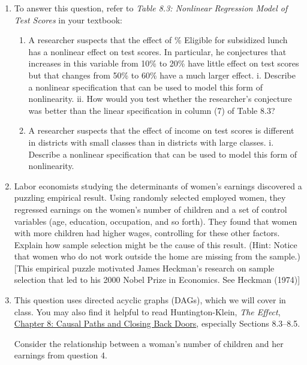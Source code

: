 \documentclass[11pt]{article}
\begin{document}
\begin{enumerate}
\item
  To answer this question, refer to \emph{Table 8.3: Nonlinear
  Regression Model of Test Scores} in your textbook:


\begin{enumerate}
\def\labelenumi{\alph{enumi}.}

\item
  A researcher suspects that the effect of \% Eligible for subsidized
  lunch has a nonlinear effect on test scores. In particular, he
  conjectures that increases in this variable from 10\% to 20\% have
  little effect on test scores but that changes from 50\% to 60\% have a
  much larger effect. i. Describe a nonlinear specification that can be
  used to model this form of nonlinearity. ii. How would you test
  whether the researcher's conjecture was better than the linear
  specification in column (7) of Table 8.3?
\item
  A researcher suspects that the effect of income on test scores is
  different in districts with small classes than in districts with large
  classes. i. Describe a nonlinear specification that can be used to
  model this form of nonlinearity.
\end{enumerate}



\item
  Labor economists studying the determinants of women's earnings
  discovered a puzzling empirical result. Using randomly selected
  employed women, they regressed earnings on the women's number of
  children and a set of control variables (age, education, occupation,
  and so forth). They found that women with more children had higher
  wages, controlling for these other factors. Explain how sample
  selection might be the cause of this result. (Hint: Notice that women
  who do not work outside the home are missing from the sample.) {[}This
  empirical puzzle motivated James Heckman's research on sample
  selection that led to his 2000 Nobel Prize in Economics. See Heckman
  (1974){]}


\item
  This question uses directed acyclic graphs (DAGs), which we will cover in class. You may also find it helpful to read Huntington-Klein, \emph{The Effect}, \href{https://theeffectbook.net/ch-CausalPaths.html}{Chapter 8: Causal Paths and Closing Back Doors}, especially Sections 8.3--8.5.

  Consider the relationship between a woman's number of children and her earnings from question 4.


\end{enumerate}
\end{document}
